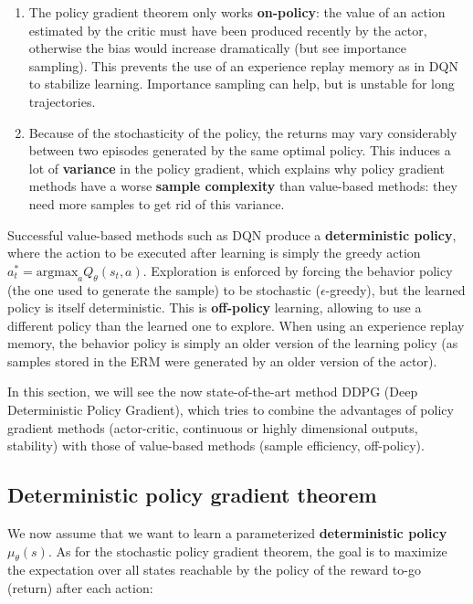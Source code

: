 \documentclass[
  letterpaper,
  DIV=11,
  numbers=noendperiod]{scrreprt}
\providecommand{\tightlist}{%
  \setlength{\itemsep}{0pt}\setlength{\parskip}{0pt}}\usepackage{longtable,booktabs,array}
\begin{document}
\begin{enumerate}
\def\labelenumi{\arabic{enumi}.}
\tightlist
\item
  The policy gradient theorem only works \textbf{on-policy}: the value
  of an action estimated by the critic must have been produced recently
  by the actor, otherwise the bias would increase dramatically (but see
  importance sampling). This prevents the use of an experience replay
  memory as in DQN to stabilize learning. Importance sampling can help,
  but is unstable for long trajectories.
\item
  Because of the stochasticity of the policy, the returns may vary
  considerably between two episodes generated by the same optimal
  policy. This induces a lot of \textbf{variance} in the policy
  gradient, which explains why policy gradient methods have a worse
  \textbf{sample complexity} than value-based methods: they need more
  samples to get rid of this variance.
\end{enumerate}

Successful value-based methods such as DQN produce a
\textbf{deterministic policy}, where the action to be executed after
learning is simply the greedy action
\(a^*_t = \text{argmax}_a Q_\theta(s_t, a)\). Exploration is enforced by
forcing the behavior policy (the one used to generate the sample) to be
stochastic (\(\epsilon\)-greedy), but the learned policy is itself
deterministic. This is \textbf{off-policy} learning, allowing to use a
different policy than the learned one to explore. When using an
experience replay memory, the behavior policy is simply an older version
of the learning policy (as samples stored in the ERM were generated by
an older version of the actor).

In this section, we will see the now state-of-the-art method DDPG (Deep
Deterministic Policy Gradient), which tries to combine the advantages of
policy gradient methods (actor-critic, continuous or highly dimensional
outputs, stability) with those of value-based methods (sample
efficiency, off-policy).

\hypertarget{deterministic-policy-gradient-theorem}{%
\subsection{Deterministic policy gradient
theorem}\label{deterministic-policy-gradient-theorem}}

We now assume that we want to learn a parameterized
\textbf{deterministic policy} \(\mu_\theta(s)\). As for the stochastic
policy gradient theorem, the goal is to maximize the expectation over
all states reachable by the policy of the reward to-go (return) after
each action:
\end{document}
